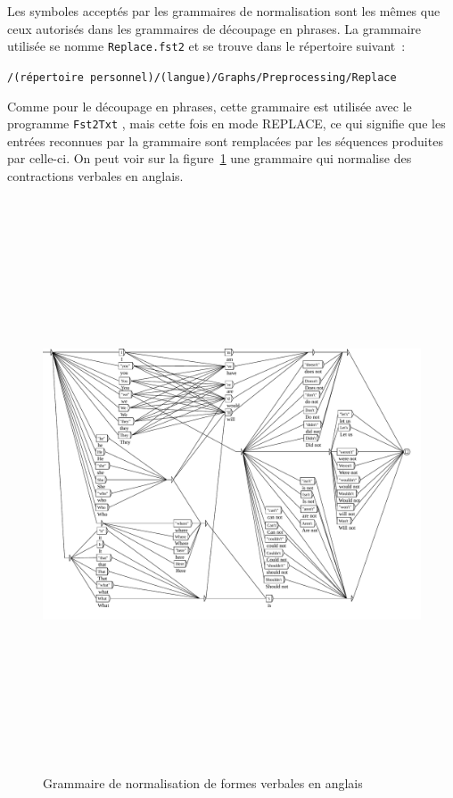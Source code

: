 \bigskip
\noindent Les symboles acceptés par les grammaires de normalisation sont les mêmes que ceux
autorisés dans les grammaires de découpage en phrases. La grammaire utilisée se nomme
\verb+Replace.fst2+ et se trouve dans le répertoire suivant~:

\bigskip \verb+/(répertoire personnel)/(langue)/Graphs/Preprocessing/Replace+

\bigskip
\noindent Comme pour le découpage en phrases, cette grammaire est utilisée avec le programme
\verb+Fst2Txt+ , mais cette fois en
mode REPLACE, ce qui signifie que les entrées reconnues par la grammaire sont remplacées par les
séquences produites par celle-ci. On peut voir sur la figure~\ref{fig-normalization-grammar} une
grammaire qui normalise des contractions verbales en anglais.

\begin{figure}[!p]
\begin{center}
\includegraphics[height=17cm,angle=90]{resources/img/fig2-11.pdf}
\caption{Grammaire de normalisation de formes verbales en anglais\label{fig-normalization-grammar}}
\end{center}
\end{figure}



